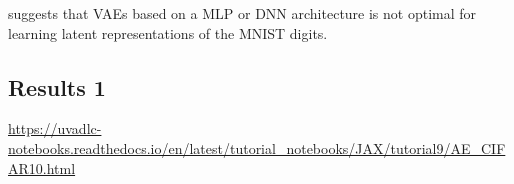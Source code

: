 suggests that VAEs based on a MLP or DNN architecture is not optimal for learning latent representations of the MNIST digits.

\subsection{Results 1}\label{sec:project results}



\url{https://uvadlc-notebooks.readthedocs.io/en/latest/tutorial_notebooks/JAX/tutorial9/AE_CIFAR10.html}




